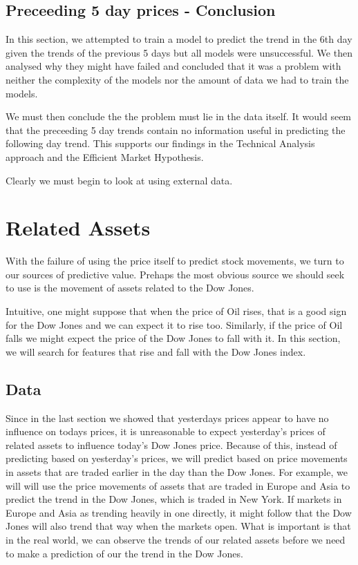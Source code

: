 \documentclass{report}
\begin{document}
\subsection{Preceeding 5 day prices - Conclusion}

In this section, we attempted to train a model to predict the trend in the 6th day given the trends of the previous 5 days but all models were unsuccessful. We then analysed why they might have failed and concluded that it was a problem with neither the complexity of the models nor the amount of data we had to train the models.

We must then conclude the the problem must lie in the data itself. It would seem that the preceeding 5 day trends contain no information useful in predicting the following day trend. This supports our findings in the Technical Analysis approach and the Efficient Market Hypothesis.

Clearly we must begin to look at using external data.

\section{Related Assets}

With the failure of using the price itself to predict stock movements, we turn to our sources of predictive value. Prehaps the most obvious source we should seek to use is the movement of assets related to the Dow Jones.

Intuitive, one might suppose that when the price of Oil rises, that is a good sign for the Dow Jones and we can expect it to rise too. Similarly, if the price of Oil falls we might expect the price of the Dow Jones to fall with it. In this section, we will search for features that rise and fall with the Dow Jones index.

\subsection{Data}

Since in the last section we showed that yesterdays prices appear to have no influence on todays prices, it is unreasonable to expect yesterday's prices of related assets to influence today's Dow Jones price. Because of this, instead of predicting based on yesterday's prices, we will predict based on price movements in assets that are traded earlier in the day than the Dow Jones. For example, we will will use the price movements of assets that are traded in Europe and Asia to predict the trend in the Dow Jones, which is traded in New York. If markets in Europe and Asia as trending heavily in one directly, it might follow that the Dow Jones will also trend that way when the markets open. What is important is that in the real world, we can observe the trends of our related assets before we need to make a prediction of our the trend in the Dow Jones.
\end{document}
